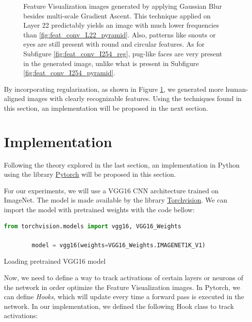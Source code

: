 \begin{figure}
    \caption{
        Feature Visualization images generated by applying Gaussian Blur besides multi-scale Gradient Ascent. 
        This technique applied on Layer 22 predictably yields an image with much lower frequencies than \ref{fig:feat_conv_L22_pyramid}. 
        Also, patterns like snouts or eyes are still present with round and circular features. 
        As for Subfigure \ref{fig:feat_conv_I254_reg}, pug-like faces are very present in the generated image, unlike what is present in Subfigure \ref{fig:feat_conv_I254_pyramid}.   
    }
    \label{fig:feat_vis_regularization}

\end{figure}

\newpage

By incorporating regularization, as shown in Figure \ref{fig:feat_vis_regularization}, we generated more human-aligned images with clearly recognizable features.
Using the techniques found in this section, an implementation will be proposed in the next section.

\section{Implementation}

Following the theory explored in the last section, an implementation in Python using the library \href{https://pytorch.org/}{Pytorch} will be proposed in this section. 

For our experiments, we will use a VGG16 CNN architecture trained on ImageNet. The model is made available by the library \href{https://pytorch.org/vision/stable/index.html}{Torchvision}. 
We can import the model with pretrained weights with the code bellow: 

\begin{program}
    \centering

    \begin{lstlisting}[language=Python, style=wider]
        from torchvision.models import vgg16, VGG16_Weights

        model = vgg16(weights=VGG16_Weights.IMAGENET1K_V1)
    \end{lstlisting}

    \caption{Loading pretrained VGG16 model}
\end{program}

Now, we need to define a way to track activations of certain layers or neurons of the network in order optimize the Feature Visualization images. 
In Pytorch, we can define \emph{Hooks}, which will update every time a forward pass is executed in the network. 
In our implementation, we defined the following Hook class to track activations:

